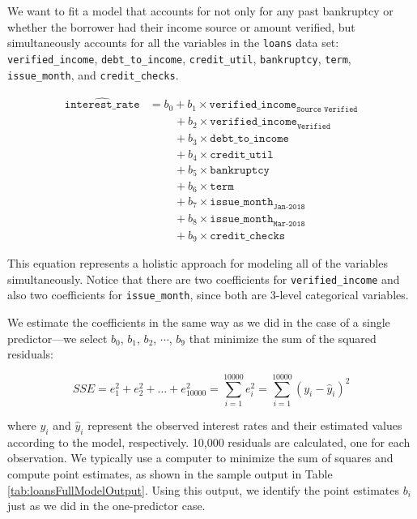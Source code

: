 \documentclass[
  10pt,
  openany]{book}
\theoremstyle{definition}
\theoremstyle{definition}
\theoremstyle{definition}
\theoremstyle{definition}
\theoremstyle{remark}
\begin{document}
We want to fit a model that accounts for not only for any past bankruptcy or whether the borrower had their income source or amount verified, but simultaneously accounts for all the variables in the \texttt{loans} data set: \texttt{verified\_income}, \texttt{debt\_to\_income}, \texttt{credit\_util}, \texttt{bankruptcy}, \texttt{term}, \texttt{issue\_month}, and \texttt{credit\_checks}.

\begin{align*}
\widehat{\texttt{interest_rate}}
    &= b_0 +
        b_1\times \texttt{verified_income}_{\texttt{Source Verified}} \\
    &\qquad\  +
        b_2\times \texttt{verified_income}_{\texttt{Verified}} \\
    &\qquad\  +
        b_3\times \texttt{debt_to_income} \\
    &\qquad\  +
        b_4 \times \texttt{credit_util} \\
    &\qquad\  +
        b_5 \times \texttt{bankruptcy} \\
    &\qquad\  +
        b_6 \times \texttt{term} \\
    &\qquad\  +
        b_7 \times \texttt{issue_month}_{\texttt{Jan-2018}} \\
    &\qquad\ +
        b_8 \times \texttt{issue_month}_{\texttt{Mar-2018}} \\
    &\qquad\  +
        b_9 \times \texttt{credit_checks}
\end{align*}

This equation represents a holistic approach for modeling all of the variables simultaneously.
Notice that there are two coefficients for \texttt{verified\_income} and also two coefficients for \texttt{issue\_month}, since both are 3-level categorical variables.

We estimate the coefficients in the same way as we did in the case of a single predictor---we select \(b_0\), \(b_1\), \(b_2\), \(\cdots\), \(b_9\) that minimize the sum of the squared residuals:

\[SSE = e_1^2 + e_2^2 + \dots + e_{10000}^2 = \sum_{i=1}^{10000} e_i^2 = \sum_{i=1}^{10000} \left(y_i - \hat{y}_i\right)^2\]

where \(y_i\) and \(\hat{y}_i\) represent the observed interest rates and their estimated values according to the model, respectively.
10,000 residuals are calculated, one for each observation.
We typically use a computer to minimize the sum of squares and compute point estimates, as shown in the sample output in
Table \ref{tab:loansFullModelOutput}.
Using this output, we identify the point estimates \(b_i\) just as we did in the one-predictor case.
\end{document}
